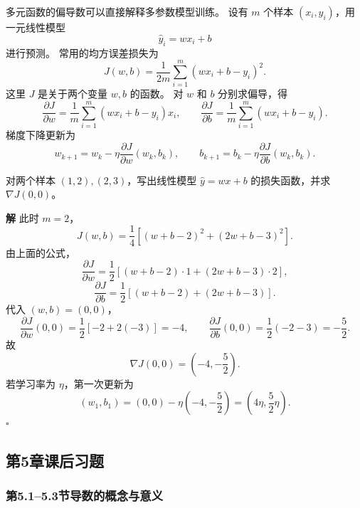 \documentclass[fontset=fandol]{ctexart}
\newenvironment{solution}{\par\noindent\textbf{解}\quad}{\hfill$\square$\par\vspace{0.8em}}
\begin{document}
\begin{application}[偏导数在多参数机器学习模型中的应用]
	
	多元函数的偏导数可以直接解释多参数模型训练。 设有 $m$ 个样本 $(x_i,y_i)$，用一元线性模型
	\[
	\hat y_i=wx_i+b
	\]
	进行预测。 常用的均方误差损失为
	\[
	J(w,b)=\frac{1}{2m}\sum_{i=1}^{m}(wx_i+b-y_i)^2.
	\]
	这里 $J$ 是关于两个变量 $w,b$ 的函数。 对 $w$ 和 $b$ 分别求偏导，得
	\[
	\frac{\partial J}{\partial w}
	=\frac{1}{m}\sum_{i=1}^{m}(wx_i+b-y_i)x_i,
	\qquad
	\frac{\partial J}{\partial b}
	=\frac{1}{m}\sum_{i=1}^{m}(wx_i+b-y_i).
	\]
	梯度下降更新为
	\[
	w_{k+1}=w_k-\eta\frac{\partial J}{\partial w}(w_k,b_k),\qquad
	b_{k+1}=b_k-\eta\frac{\partial J}{\partial b}(w_k,b_k).
	\]
	
	\begin{example}
		对两个样本 $(1,2),(2,3)$，写出线性模型 $\hat y=wx+b$ 的损失函数，并求 $\nabla J(0,0)$。
	\end{example}
	\begin{solution}
		此时 $m=2$，
		\[
		J(w,b)=\frac14\left[(w+b-2)^2+(2w+b-3)^2\right].
		\]
		由上面的公式，
		\[
		\frac{\partial J}{\partial w}
		=\frac12\left[(w+b-2)\cdot1+(2w+b-3)\cdot2\right],
		\]
		\[
		\frac{\partial J}{\partial b}
		=\frac12\left[(w+b-2)+(2w+b-3)\right].
		\]
		代入 $(w,b)=(0,0)$，
		\[
		\frac{\partial J}{\partial w}(0,0)=\frac12[-2+2(-3)]=-4,\qquad
		\frac{\partial J}{\partial b}(0,0)=\frac12(-2-3)=-\frac52.
		\]
		故
		\[
		\nabla J(0,0)=\left(-4,-\frac52\right).
		\]
		若学习率为 $\eta$，第一次更新为
		\[
		(w_1,b_1)=\left(0,0\right)-\eta\left(-4,-\frac52\right)
		=\left(4\eta,\frac52\eta\right).
		\]
	\end{solution}
	
	
	
	
\end{application}





\iffalse

\subsection*{第5章课后习题}

\subsubsection*{第5.1--5.3节\quad 导数的概念与意义}
\end{document}
